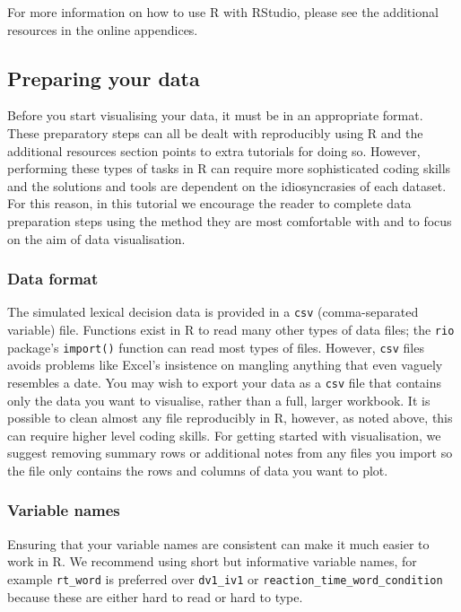 \documentclass[
  english,
  doc,floatsintext]{apa6}
\begin{document}
For more information on how to use R with RStudio, please see the additional resources in the online appendices.

\hypertarget{preparing-your-data}{%
\subsection{Preparing your data}\label{preparing-your-data}}

Before you start visualising your data, it must be in an appropriate format. These preparatory steps can all be dealt with reproducibly using R and the additional resources section points to extra tutorials for doing so. However, performing these types of tasks in R can require more sophisticated coding skills and the solutions and tools are dependent on the idiosyncrasies of each dataset. For this reason, in this tutorial we encourage the reader to complete data preparation steps using the method they are most comfortable with and to focus on the aim of data visualisation.

\hypertarget{data-format}{%
\subsubsection{Data format}\label{data-format}}

The simulated lexical decision data is provided in a \texttt{csv} (comma-separated variable) file. Functions exist in R to read many other types of data files; the \texttt{rio} package's \texttt{import()} function can read most types of files. However, \texttt{csv} files avoids problems like Excel's insistence on mangling anything that even vaguely resembles a date. You may wish to export your data as a \texttt{csv} file that contains only the data you want to visualise, rather than a full, larger workbook. It is possible to clean almost any file reproducibly in R, however, as noted above, this can require higher level coding skills. For getting started with visualisation, we suggest removing summary rows or additional notes from any files you import so the file only contains the rows and columns of data you want to plot.

\hypertarget{variable-names}{%
\subsubsection{Variable names}\label{variable-names}}

Ensuring that your variable names are consistent can make it much easier to work in R. We recommend using short but informative variable names, for example \texttt{rt\_word} is preferred over \texttt{dv1\_iv1} or \texttt{reaction\_time\_word\_condition} because these are either hard to read or hard to type.
\end{document}
